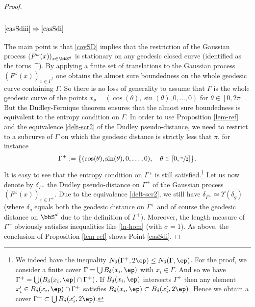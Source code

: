 \begin{proof}
\subsubsection*{$\eqref{casSdiii}\Rightarrow\eqref{casSdi}$}
The main point is that \eqref{covSD} implies that the restriction of the Gaussian process $(F^\omega(x))_{x\in\bbS^d}$ is stationary on any geodesic closed curve (identified as the torus~$\mathbb{T}$).
By applying a finite set of translations to the Gaussian process $(F^\omega(x))_{x\in \Gamma}$, one obtains the almost sure boundedness on the whole geodesic curve containing $\Gamma$.
So there is no loss of generality to assume that $\Gamma$ is the whole geodesic curve of the points $x_\theta=(\cos(\theta),\sin(\theta),0,\dots,0)$ for $\theta \in [0,2\pi]$.
But the Dudley-Fernique theorem ensures that the almost sure boundedness is equivalent to the entropy condition on $\Gamma$.
In order to use Proposition \ref{lem-ref} and the equivalence \eqref{delt-scr2} of the Dudley pseudo-distance, we need to restrict to a subcurve of $\Gamma$ on which the geodesic distance is strictly less that $\pi$, for instance
\begin{equation}\label{gammapl}
\Gamma^{+}:=\bigl\{(\cos(\theta),\sin(\theta),0,\dots,0),\quad \theta \in[0,\sfrac{\pi}{2}] \bigr\}.
\end{equation}
It is easy to see that the entropy condition on $\Gamma^{+}$ is still satisfied.\footnote{We indeed have the inequality $N_{\delta}(\Gamma^+,2\ep)\leq N_{\delta}(\Gamma,\ep)$. For the proof, we consider a finite cover $\Gamma=\bigcup B_{\delta}(x_i,\ep)$ with $x_i\in \Gamma$.
And so we have $\Gamma^+=\bigcup (B_{\delta}(x_i,\ep)\cap \Gamma^+)$.
If $B_{\delta}(x_i,\ep)$ intersects $\Gamma^+$ then any element $x_i'\in B_{\delta}(x_i,\ep)\cap \Gamma^{+}$ satisfies $B_{\delta}(x_i,\ep)\subset B_{\delta}(x_i',2\ep)$. Hence we obtain a cover $\Gamma^+\subset \bigcup B_{\delta}(x_i',2\ep)$.}
Let us now denote by $\delta_{\Gamma^+}$ the Dudley pseudo-distance on $\Gamma^+$ of the Gaussian process $(F^\omega(x))_{x\in \Gamma^+}$. Due to the equivalence \eqref{delt-scr2}, we still have $\delta_{\Gamma^+}\simeq \Upsilon(\delta_g)$ (where $\delta_g$ equals both the geodesic distance on $\Gamma^{+}$ and of course the geodesic distance on $\bbS^d$ due to the definition of $\Gamma^{+}$). Moreover, the length measure of $\Gamma^+$ obviously satisfies inequalities like \eqref{ln-hom} (with $\sigma=1$). As above, the conclusion of Proposition \ref{lem-ref} shows Point \eqref{casSdi}.
\end{proof}

